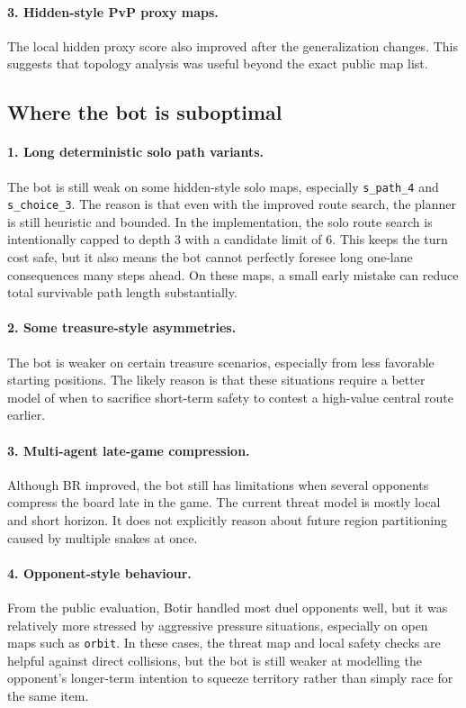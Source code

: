 \documentclass[11pt,a4paper]{article}
\begin{document}
\paragraph{3. Hidden-style PvP proxy maps.}
The local hidden proxy score also improved after the generalization changes. This suggests that topology analysis was useful beyond the exact public map list.

\subsection{Where the bot is suboptimal}
\paragraph{1. Long deterministic solo path variants.}
The bot is still weak on some hidden-style solo maps, especially \texttt{s\_path\_4} and \texttt{s\_choice\_3}. The reason is that even with the improved route search, the planner is still heuristic and bounded. In the implementation, the solo route search is intentionally capped to depth \(3\) with a candidate limit of \(6\). This keeps the turn cost safe, but it also means the bot cannot perfectly foresee long one-lane consequences many steps ahead. On these maps, a small early mistake can reduce total survivable path length substantially.

\paragraph{2. Some treasure-style asymmetries.}
The bot is weaker on certain treasure scenarios, especially from less favorable starting positions. The likely reason is that these situations require a better model of when to sacrifice short-term safety to contest a high-value central route earlier.

\paragraph{3. Multi-agent late-game compression.}
Although BR improved, the bot still has limitations when several opponents compress the board late in the game. The current threat model is mostly local and short horizon. It does not explicitly reason about future region partitioning caused by multiple snakes at once.

\paragraph{4. Opponent-style behaviour.}
From the public evaluation, Botir handled most duel opponents well, but it was relatively more stressed by aggressive pressure situations, especially on open maps such as \texttt{orbit}. In these cases, the threat map and local safety checks are helpful against direct collisions, but the bot is still weaker at modelling the opponent's longer-term intention to squeeze territory rather than simply race for the same item.
\end{document}
